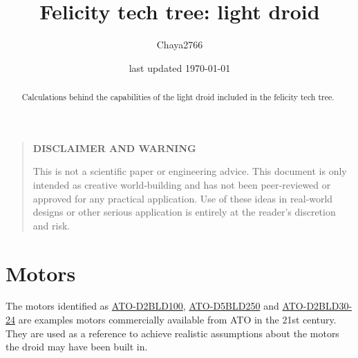 \documentclass[a4paper]{article}
\title{Felicity tech tree: light droid}
\author{Chaya2766}
\date{last updated \today}
\begin{document}
	\sffamily
	\hyphenchar{}
	\sloppy
	
	\maketitle
	
	\textbf{
		\sloppy
		\hyphenchar{}
		}
	
	\vfill
	
	\begin{abstract}
		Calculations behind the capabilities of the light droid included in the felicity tech tree.
	\end{abstract}
	
	\vfill
	
	\begin{quote}
		\begin{center}
			\textbf{DISCLAIMER AND WARNING}
		\end{center}
		
		This is not a scientific paper or engineering advice.
		This document is only intended as creative world‑building and has not been peer‑reviewed or approved for any practical application.
		Use of these ideas in real‑world designs or other serious application is entirely at the reader’s discretion and risk.
	\end{quote}
	
	\vfill
	
	\tableofcontents
	
	\pagebreak
	
	\section{Motors}
	
	The motors identified as \href{https://www.ato.com/100w-bldc-motor}{ATO-D2BLD100}, \href{https://www.ato.com/250w-bldc-motor}{ATO-D5BLD250} and \href{https://www.ato.com/30-w-dc-gear-motor}{ATO-D2BLD30-24} are examples motors commercially available from ATO in the 21st century.
	They are used as a reference to achieve realistic assumptions about the motors the droid may have been built in.
	
	\scriptsize
	
\end{document}
